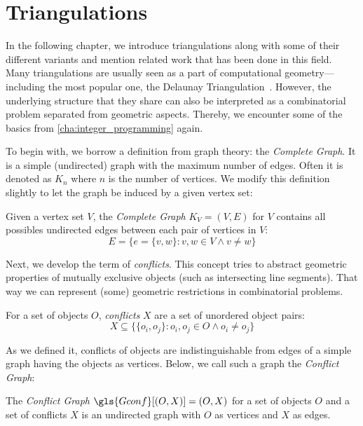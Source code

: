 \chapter{Triangulations}
\label{cha:triangulations}
In the following chapter, we introduce triangulations along with some
of their different variants and mention related work that has been done in
this field. Many triangulations are usually seen as a part of
computational geometry---including the most popular one, the
Delaunay Triangulation~\cite[Section 9.2]{deberg_compgeom}.
However, the underlying structure that they share can
also be interpreted as a combinatorial problem separated from
geometric aspects. Thereby, we encounter some of the basics from
\cref{cha:integer_programming} again.

To begin with, we borrow a definition from graph theory: the 
\emph{Complete Graph}. It is a simple (undirected) graph with the
maximum number of edges. Often it is denoted as \(K_n\) where \(n\) is
the number of vertices. We modify this definition slightly to let the
graph be induced by a given vertex set:

\begin{definition}
  Given a vertex set \(V\), the \emph{Complete Graph} \(K_V=(V,E)\)
  for \(V\) contains all possibles undirected edges between
  each pair of vertices in \(V\):
  \[ E = \{ e=\{ v, w \} : v,w \in V \land v\not=w \} \]
\end{definition}

Next, we develop the term of \emph{conflicts}. This concept
tries to abstract geometric properties of mutually exclusive objects
(such as intersecting line segments). That way we can represent (some)
geometric restrictions in combinatorial problems.

\begin{definition}[Conflicts]
  \label{def:edge_conflicts}
  For a set of objects \(O\), \emph{conflicts} \(X\) are a set of
  unordered object pairs:
  \[
    X \subseteq
    \{ \{ o_i, o_j \} : o_i, o_j \in O \land o_i \not= o_j \}
  \]
\end{definition}

As we defined it, conflicts of objects are indistinguishable from
edges of a simple graph having the objects as vertices. Below, we call
such a graph the \emph{Conflict Graph}:

\begin{definition}
  \label{def:conflict_graph}
  The \emph{Conflict Graph} \(\gls{Gconf}[(O,X)] = (O,X)\)
  for a set of objects \(O\) and a set of conflicts \(X\)
  is an undirected graph with \(O\) as vertices and \(X\) as edges.
\end{definition}

